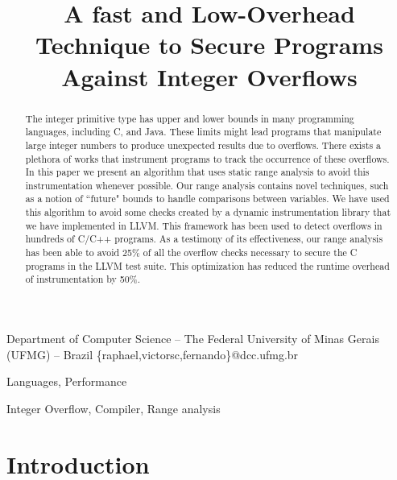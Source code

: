 \documentclass{sigplanconf}[10pt]
\begin{document}
\copyrightdata{[to be supplied]} 


\title{A fast and Low-Overhead Technique to Secure Programs Against
Integer Overflows}

           {Department of Computer Science -- The Federal University of Minas Gerais (UFMG) -- Brazil}
           {\{raphael,victorsc,fernando\}@dcc.ufmg.br}

\maketitle

\begin{abstract}
The integer primitive type has upper and lower bounds in many programming
languages, including C, and Java.
These limits might lead programs that manipulate large integer numbers to
produce unexpected results due to overflows.
There exists a plethora of works that instrument programs to track the occurrence
of these overflows.
In this paper we present an algorithm that uses static range analysis to
avoid this instrumentation whenever possible.
Our range analysis contains novel techniques, such as a notion of ``future"
bounds to handle comparisons between variables.
We have used this algorithm to avoid some checks created by a dynamic instrumentation
library that we have implemented in LLVM.
This framework has been used to detect overflows in hundreds of C/C++ programs.
As a testimony of its effectiveness, our range analysis has been able to avoid
25\% of all the overflow checks necessary to secure the C programs in the
LLVM test suite.
This optimization has reduced the runtime overhead of instrumentation by 50\%.
\end{abstract}


\terms
Languages, Performance

\keywords
Integer Overflow, Compiler, Range analysis

\section{Introduction}
\label{sec:int}
\end{document}
